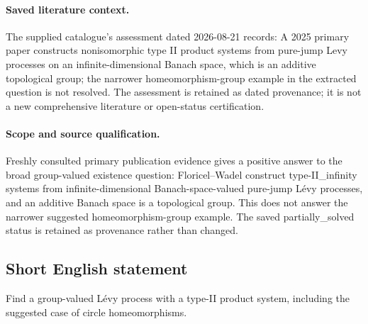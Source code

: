 \documentclass[11pt]{article}
\begin{document}
\paragraph{Saved literature context.} The supplied catalogue's assessment dated 2026-08-21 records: A 2025 primary paper constructs nonisomorphic type II product systems from pure-jump Levy processes on an infinite-dimensional Banach space, which is an additive topological group; the narrower homeomorphism-group example in the extracted question is not resolved. The assessment is retained as dated provenance; it is not a new comprehensive literature or open-status certification.
\paragraph{Scope and source qualification.}Freshly consulted primary publication evidence gives a positive answer to the broad group-valued existence question: Floricel--Wadel construct type-II_infinity systems from infinite-dimensional Banach-space-valued pure-jump Lévy processes, and an additive Banach space is a topological group. This does not answer the narrower suggested homeomorphism-group example. The saved partially_solved status is retained as provenance rather than changed.
\subsection{Short English statement}
Find a group-valued Lévy process with a type-II product system, including the suggested case of circle homeomorphisms.
\end{document}

